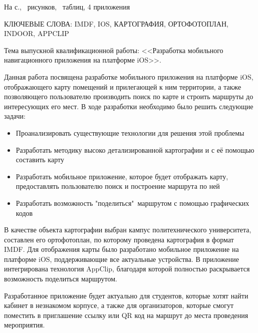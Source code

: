 \noindent На \pageref{LastPage} с., \totalfigures\ рисунков, \totaltables\ таблиц, 4 приложения

\MakeUppercase{
  ключевые слова: imdf, ios, картография, ортофотоплан, indoor, appclip
}

Тема выпускной квалификационной работы: <<Разработка мобильного навигационного приложения на платформе iOS>>.

Данная работа посвящена разработке мобильного приложения на платформе iOS, отображающего карту помещений и прилегающей к ним территории, а также позволяющего пользователю производить поиск по карте и строить маршруты до интересующих его мест.
В ходе разработки необходимо было решить следующие задачи:
\begin{itemize}
  \item Проанализировать существующие технологии для решения этой проблемы
  \item Разработать методику высоко детализированной картографии и с её помощью составить карту
  \item Разработать мобильное приложение, которое будет отображать карту, предоставлять пользователю поиск и построение маршрута по ней
  \item Разработать возможность "поделиться"\ маршрутом с помощью графических кодов
\end{itemize}

В качестве объекта картографии выбран кампус политехнического университета, составлен его ортофотоплан, по которому проведена картография в формат IMDF. Для отображения карты было разработано мобильное приложение на платформе iOS, поддерживающие все актуальные устройства. В приложение интегрирована технология AppClip, благодаря которой полностью раскрывается возможность поделиться маршрутом.

Разработанное приложение будет актуально для студентов, которые хотят найти кабинет в незнакомом корпусе, а также для организаторов, которые смогут поместить в приглашение ссылку или QR код на маршрут до места проведения мероприятия.
